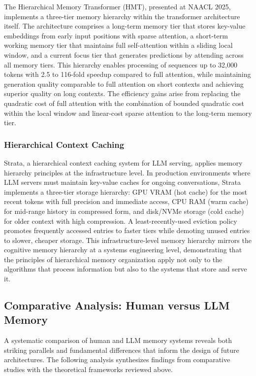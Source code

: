The Hierarchical Memory Transformer (HMT), presented at NAACL 2025, implements a three-tier memory hierarchy within the transformer architecture itself. The architecture comprises a long-term memory tier that stores key-value embeddings from early input positions with sparse attention, a short-term working memory tier that maintains full self-attention within a sliding local window, and a current focus tier that generates predictions by attending across all memory tiers. This hierarchy enables processing of sequences up to 32,000 tokens with 2.5 to 116-fold speedup compared to full attention, while maintaining generation quality comparable to full attention on short contexts and achieving superior quality on long contexts. The efficiency gains arise from replacing the quadratic cost of full attention with the combination of bounded quadratic cost within the local window and linear-cost sparse attention to the long-term memory tier.

\subsubsection{Hierarchical Context Caching}

Strata, a hierarchical context caching system for LLM serving, applies memory hierarchy principles at the infrastructure level. In production environments where LLM servers must maintain key-value caches for ongoing conversations, Strata implements a three-tier storage hierarchy: GPU VRAM (hot cache) for the most recent tokens with full precision and immediate access, CPU RAM (warm cache) for mid-range history in compressed form, and disk/NVMe storage (cold cache) for older context with high compression. A least-recently-used eviction policy promotes frequently accessed entries to faster tiers while demoting unused entries to slower, cheaper storage. This infrastructure-level memory hierarchy mirrors the cognitive memory hierarchy at a systems engineering level, demonstrating that the principles of hierarchical memory organization apply not only to the algorithms that process information but also to the systems that store and serve it.

\subsection{Comparative Analysis: Human versus LLM Memory}

A systematic comparison of human and LLM memory systems reveals both striking parallels and fundamental differences that inform the design of future architectures. The following analysis synthesizes findings from comparative studies \citep{cowan2024judgments, arrieta2024llm_cognitive} with the theoretical frameworks reviewed above.

